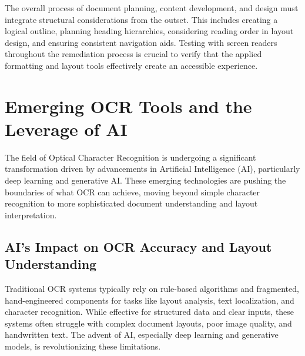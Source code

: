 The overall process of document planning, content development, and design must integrate structural considerations from the outset. This includes creating a logical outline, planning heading hierarchies, considering reading order in layout design, and ensuring consistent navigation aids. Testing with screen readers throughout the remediation process is crucial to verify that the applied formatting and layout tools effectively create an accessible experience.

\section{Emerging OCR Tools and the Leverage of AI}

The field of Optical Character Recognition is undergoing a significant transformation driven by advancements in Artificial Intelligence (AI), particularly deep learning and generative AI. These emerging technologies are pushing the boundaries of what OCR can achieve, moving beyond simple character recognition to more sophisticated document understanding and layout interpretation.

\subsection{AI's Impact on OCR Accuracy and Layout Understanding}

Traditional OCR systems typically rely on rule-based algorithms and fragmented, hand-engineered components for tasks like layout analysis, text localization, and character recognition. While effective for structured data and clear inputs, these systems often struggle with complex document layouts, poor image quality, and handwritten text. The advent of AI, especially deep learning and generative models, is revolutionizing these limitations.

